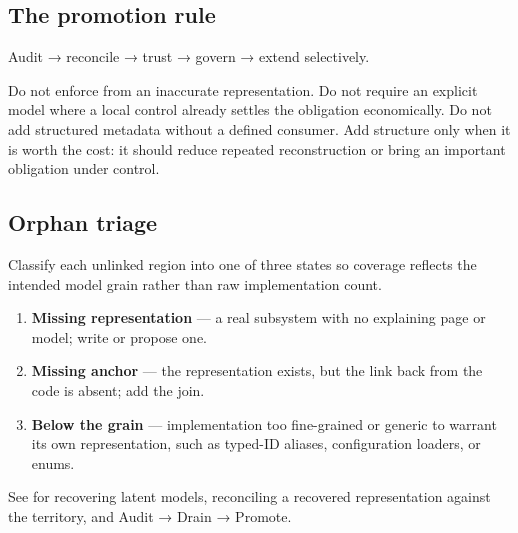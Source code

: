 \subsection{The promotion rule}\label{heading:the-promotion-rule}

Audit → reconcile → trust → govern → extend selectively.

Do not enforce from an inaccurate representation. Do not require an explicit model where a local control already settles the obligation economically. Do not add structured metadata without a defined consumer. Add structure only when it is worth the cost: it should reduce repeated reconstruction or bring an important obligation under control.

\subsection{Orphan triage}\label{heading:orphan-triage}

Classify each unlinked region into one of three states so coverage reflects the intended model grain rather than raw implementation count.

\begin{enumerate}
\def\labelenumi{\arabic{enumi}.}
\tightlist
\item
  \textbf{Missing representation} --- a real subsystem with no explaining page or model; write or propose one.
\item
  \textbf{Missing anchor} --- the representation exists, but the link back from the code is absent; add the join.
\item
  \textbf{Below the grain} --- implementation too fine-grained or generic to warrant its own representation, such as typed-ID aliases, configuration loaders, or enums.
\end{enumerate}

See \href{4.3-brownfield-engineering.html}{} for recovering latent models, reconciling a recovered representation against the territory, and Audit → Drain → Promote.
